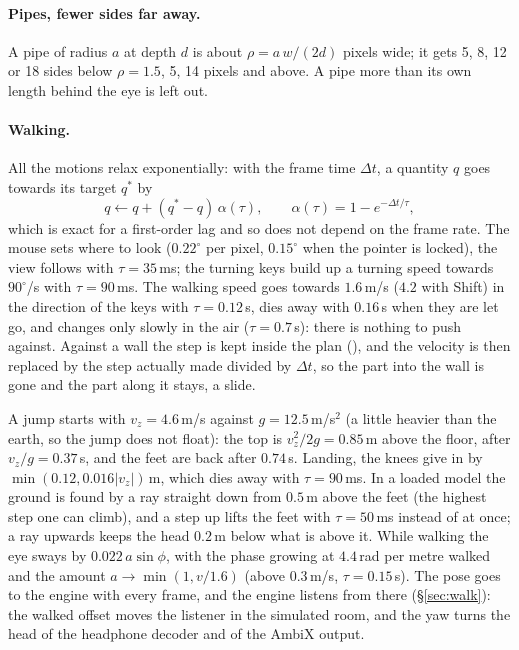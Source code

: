 \paragraph{Pipes, fewer sides far away.} A pipe of radius $a$ at depth $d$ is about $\rho = a\,w/(2d)$ pixels wide;
it gets 5, 8, 12 or 18 sides below $\rho = 1.5$, 5, 14 pixels and above. A pipe more than its own length behind the
eye is left out.

\paragraph{Walking.} All the motions relax exponentially: with the frame time $\Delta t$, a quantity $q$ goes towards
its target $q^*$ by
\begin{equation}
  q \leftarrow q + (q^*-q)\,\alpha(\tau),\qquad \alpha(\tau) = 1 - e^{-\Delta t/\tau},
\end{equation}
which is exact for a first-order lag and so does not depend on the frame rate. The mouse sets where to look
($0.22^\circ$ per pixel, $0.15^\circ$ when the pointer is locked), the view follows with $\tau = 35$\,ms; the turning
keys build up a turning speed towards $90^\circ$/s with $\tau = 90$\,ms. The walking speed goes towards $1.6$\,m/s
($4.2$ with Shift) in the direction of the keys with $\tau = 0.12$\,s, dies away with $0.16$\,s when they are let go,
and changes only slowly in the air ($\tau = 0.7$\,s): there is nothing to push against. Against a wall the step is
kept inside the plan (), and the velocity is then replaced by the step actually made divided by
$\Delta t$, so the part into the wall is gone and the part along it stays, a slide.

A jump starts with $v_z = 4.6$\,m/s against $g = 12.5$\,m/s$^2$ (a little heavier than the earth, so the jump does
not float): the top is $v_z^2/2g = 0.85$\,m above the floor, after $v_z/g = 0.37$\,s, and the feet are back after
$0.74$\,s. Landing, the knees give in by $\min(0.12, 0.016|v_z|)$\,m, which dies away with $\tau = 90$\,ms. In a
loaded model the ground is found by a ray straight down from $0.5$\,m above the feet (the highest step one can climb),
and a step up lifts the feet with $\tau = 50$\,ms instead of at once; a ray upwards keeps the head $0.2$\,m below
what is above it. While walking the eye sways by $0.022\,a\sin\phi$, with the phase growing at $4.4$\,rad per metre
walked and the amount $a\to\min(1, v/1.6)$ (above $0.3$\,m/s, $\tau = 0.15$\,s). The pose goes to the engine with
every frame, and the engine listens from there (\S\ref{sec:walk}): the walked offset moves the listener in the
simulated room, and the yaw turns the head of the headphone decoder and of the AmbiX output.

